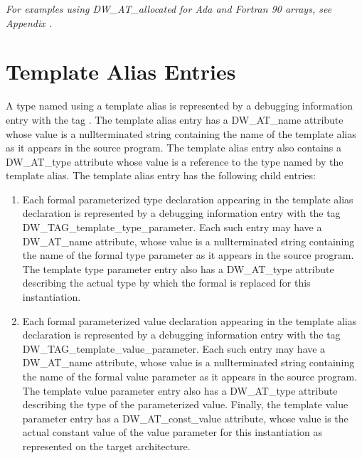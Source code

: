 \textit{For examples using DW\_AT\_allocated for Ada and Fortran 90
arrays, 
see Appendix .}



\section{Template Alias Entries}
\label{chap:templatealiasentries}

A type named using a template alias is represented
by a debugging information entry with the tag
. 
The template alias entry has a
DW\-\_AT\-\_name attribute whose value is a null\dash terminated string
containing the name of the template alias as it appears in
the source program. The template alias entry also contains a
DW\-\_AT\-\_type attribute whose value is a reference to the type
named by the template alias. The template alias entry has
the following child entries:

\begin{enumerate}[1.]
\item Each formal parameterized type declaration appearing
in the template alias declaration is represented
by a debugging information entry with the tag
DW\-\_TAG\-\_template\-\_type\-\_parameter. Each such entry may have
a DW\_AT\_name attribute, whose value is a null\dash terminated
string containing the name of the formal type parameter as it
appears in the source program. The template type parameter
entry also has a DW\-\_AT\-\_type attribute describing the actual
type by which the formal is replaced for this instantiation.

\item Each formal parameterized value declaration
appearing in the template alias declaration is
represented by a debugging information entry with the tag
DW\-\_TAG\-\_template\-\_value\-\_parameter. Each such entry may have
a DW\-\_AT\-\_name attribute, whose value is a null\dash terminated
string containing the name of the formal value parameter
as it appears in the source program. The template value
parameter entry also has a DW\-\_AT\-\_type attribute describing
the type of the parameterized value. Finally, the template
value parameter entry has a DW\-\_AT\-\_const\-\_value attribute, whose
value is the actual constant value of the value parameter for
this instantiation as represented on the target architecture.
\end{enumerate}


